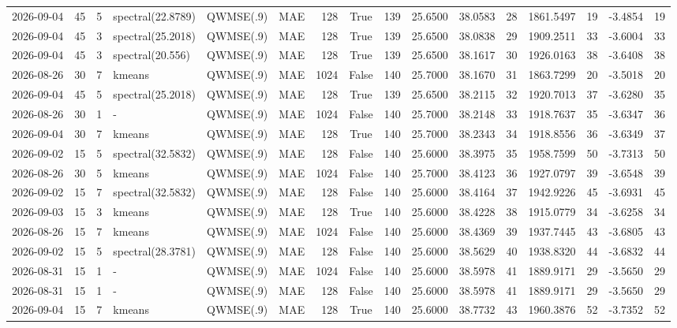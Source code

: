 \documentclass[10pt]{article}
\begin{document}
\begin{landscape}
\begin{longtable}{@{}lrrlllrcrrrrrrrr@{}}
2026-09-04 & 45 & 5 & spectral(22.8789) & QWMSE(.9) & MAE & 128 & True & 139 & 25.6500 & 38.0583 & 28 & 1861.5497 & 19 & -3.4854 & 19 \\
2026-09-04 & 45 & 3 & spectral(25.2018) & QWMSE(.9) & MAE & 128 & True & 139 & 25.6500 & 38.0838 & 29 & 1909.2511 & 33 & -3.6004 & 33 \\
2026-09-04 & 45 & 3 & spectral(20.556) & QWMSE(.9) & MAE & 128 & True & 139 & 25.6500 & 38.1617 & 30 & 1926.0163 & 38 & -3.6408 & 38 \\
2026-08-26 & 30 & 7 & kmeans & QWMSE(.9) & MAE & 1024 & False & 140 & 25.7000 & 38.1670 & 31 & 1863.7299 & 20 & -3.5018 & 20 \\
2026-09-04 & 45 & 5 & spectral(25.2018) & QWMSE(.9) & MAE & 128 & True & 139 & 25.6500 & 38.2115 & 32 & 1920.7013 & 37 & -3.6280 & 35 \\
2026-08-26 & 30 & 1 & - & QWMSE(.9) & MAE & 1024 & False & 140 & 25.7000 & 38.2148 & 33 & 1918.7637 & 35 & -3.6347 & 36 \\
2026-09-04 & 30 & 7 & kmeans & QWMSE(.9) & MAE & 128 & True & 140 & 25.7000 & 38.2343 & 34 & 1918.8556 & 36 & -3.6349 & 37 \\
2026-09-02 & 15 & 5 & spectral(32.5832) & QWMSE(.9) & MAE & 128 & False & 140 & 25.6000 & 38.3975 & 35 & 1958.7599 & 50 & -3.7313 & 50 \\
2026-08-26 & 30 & 5 & kmeans & QWMSE(.9) & MAE & 1024 & False & 140 & 25.7000 & 38.4123 & 36 & 1927.0797 & 39 & -3.6548 & 39 \\
2026-09-02 & 15 & 7 & spectral(32.5832) & QWMSE(.9) & MAE & 128 & False & 140 & 25.6000 & 38.4164 & 37 & 1942.9226 & 45 & -3.6931 & 45 \\
2026-09-03 & 15 & 3 & kmeans & QWMSE(.9) & MAE & 128 & True & 140 & 25.6000 & 38.4228 & 38 & 1915.0779 & 34 & -3.6258 & 34 \\
2026-08-26 & 15 & 7 & kmeans & QWMSE(.9) & MAE & 1024 & False & 140 & 25.6000 & 38.4369 & 39 & 1937.7445 & 43 & -3.6805 & 43 \\
2026-09-02 & 15 & 5 & spectral(28.3781) & QWMSE(.9) & MAE & 128 & False & 140 & 25.6000 & 38.5629 & 40 & 1938.8320 & 44 & -3.6832 & 44 \\
2026-08-31 & 15 & 1 & - & QWMSE(.9) & MAE & 1024 & False & 140 & 25.6000 & 38.5978 & 41 & 1889.9171 & 29 & -3.5650 & 29 \\
2026-08-31 & 15 & 1 & - & QWMSE(.9) & MAE & 128 & False & 140 & 25.6000 & 38.5978 & 41 & 1889.9171 & 29 & -3.5650 & 29 \\
2026-09-04 & 15 & 7 & kmeans & QWMSE(.9) & MAE & 128 & True & 140 & 25.6000 & 38.7732 & 43 & 1960.3876 & 52 & -3.7352 & 52 \\

\end{longtable}
\end{landscape}
\end{document}
